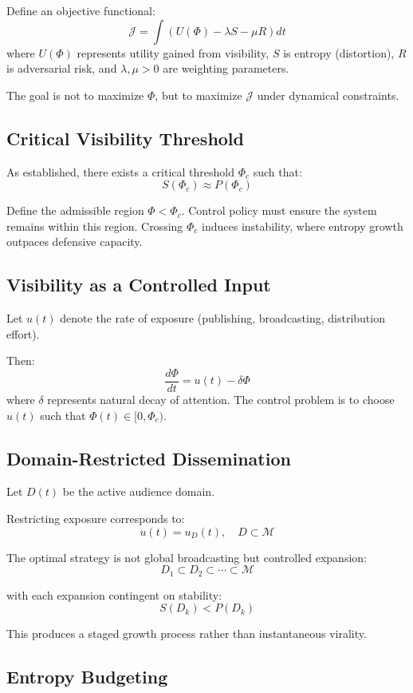 \documentclass[12pt,a4paper]{article}
\begin{document}
Define an objective functional:
\[
\mathcal{J} = \int \left( U(\Phi) - \lambda S - \mu R \right) dt
\]
where $U(\Phi)$ represents utility gained from visibility, $S$ is entropy (distortion), $R$ is adversarial risk, and $\lambda, \mu > 0$ are weighting parameters.

The goal is not to maximize $\Phi$, but to maximize $\mathcal{J}$ under dynamical constraints.

\subsection{Critical Visibility Threshold}

As established, there exists a critical threshold $\Phi_c$ such that:
\[
S(\Phi_c) \approx P(\Phi_c)
\]

Define the admissible region $\Phi < \Phi_c$. Control policy must ensure the system remains within this region. Crossing $\Phi_c$ induces instability, where entropy growth outpaces defensive capacity.

\subsection{Visibility as a Controlled Input}

Let $u(t)$ denote the rate of exposure (publishing, broadcasting, distribution effort).

Then:
\[
\frac{d\Phi}{dt} = u(t) - \delta \Phi
\]
where $\delta$ represents natural decay of attention. The control problem is to choose $u(t)$ such that $\Phi(t) \in [0, \Phi_c)$.

\subsection{Domain-Restricted Dissemination}

Let $D(t)$ be the active audience domain.

Restricting exposure corresponds to:
\[
u(t) = u_D(t), \quad D \subset \mathcal{M}
\]

The optimal strategy is not global broadcasting but controlled expansion:
\[
D_1 \subset D_2 \subset \cdots \subset \mathcal{M}
\]

with each expansion contingent on stability:
\[
S(D_k) < P(D_k)
\]

This produces a staged growth process rather than instantaneous virality.

\subsection{Entropy Budgeting}
\end{document}
